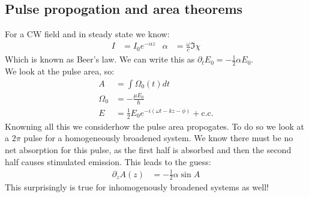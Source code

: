 \subsection{Pulse propogation and area theorems}
For a CW field and in steady state we know:
\begin{align*}
	I &= I_0 e^{-\alpha z} &
	\alpha &= \frac{\omega}{c} \Im\chi
\end{align*}
Which is known as Beer's law. We can write this as $\partial_t E_0 = -\frac{1}{2}\alpha E_0$. \\
We look at the pulse area, so:
\begin{align*}
	A &= \int\Omega_0(t) dt \\
	\Omega_0 &= -\frac{\mu E_0}{\hbar} \\
	E &= \frac{1}{2} E_0 e^{-i(\omega t - kz - \phi)} + \text{c.c.}
\end{align*}
Knowning all this we considerhow the pulse area propogates. To do so we look at a $2\pi$ pulse for a homogeneously broadened system.
We know there must be no net absorption for this pulse, as the first half is absorbed and then the second half causes stimulated emission. This leads to the guess:
\begin{align*}
	\partial_z A(z) &= -\frac{1}{2}\alpha\sin A
\end{align*}
This surprisingly is true for inhomogenously broadened systems as well!


